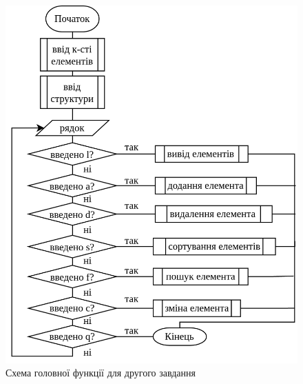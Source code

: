 \documentclass[12pt]{extreport}
\begin{document}
\newpage
\begin{figure}[h]
	\centering
	\includegraphics[width=.6\textwidth]{fch2/main.png}
	\caption{Схема головної функції для другого завдання}
	\label{task2}
\end{figure}
\end{document}
